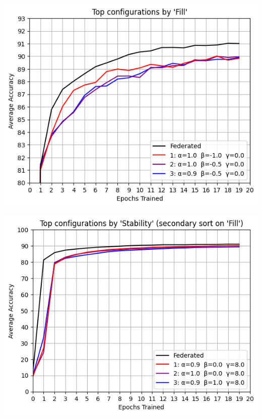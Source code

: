 \documentclass{beamer}
\begin{document}
	\begin{frame}
		\includegraphics[width = \textwidth]{fill_zoom}
	\end{frame}

	\begin{frame}
		\includegraphics[width = \textwidth]{stability}
	\end{frame}
	
\end{document}
